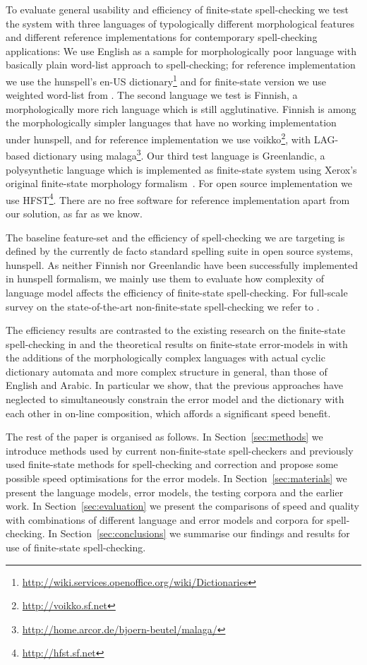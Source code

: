 \documentclass[11pt]{article}
\begin{document}
To evaluate general usability and efficiency of finite-state spell-checking we
test the system with three languages of typologically different morphological
features and different reference implementations for contemporary
spell-checking applications: We use English as a sample for morphologically
poor language with basically plain word-list approach to spell-checking; for
reference implementation we use the hunspell's en-US
dictionary\footnote{\url{http://wiki.services.openoffice.org/wiki/Dictionaries}}
and for finite-state version we use weighted word-list
from .  The second language we test is Finnish, a
morphologically more rich language which is still agglutinative. Finnish is
among the morphologically simpler languages that have no working implementation
under hunspell, and for reference implementation we use
voikko\footnote{\url{http://voikko.sf.net}}, with LAG-based dictionary using
malaga\footnote{\url{http://home.arcor.de/bjoern-beutel/malaga/}}. Our third
test language is Greenlandic, a polysynthetic language which is implemented as
finite-state system using Xerox's original finite-state morphology
formalism~\cite{beesley/2003}. For open source implementation we use
HFST\footnote{\url{http://hfst.sf.net}}. There are no free software for
reference implementation apart from our solution, as far as we know.

The baseline feature-set and the efficiency of spell-checking we are targeting
is defined by the currently de facto standard spelling suite in open source
systems, hunspell. As neither Finnish nor Greenlandic have been successfully
implemented in hunspell formalism, we mainly use them to evaluate how complexity
of language model affects the efficiency of finite-state spell-checking. For
full-scale survey on the state-of-the-art non-finite-state spell-checking we
refer to .

The efficiency results are contrasted to the existing research on the
finite-state spell-checking in  and the theoretical
results on finite-state error-models in  with the
additions of the morphologically complex languages with actual cyclic
dictionary automata and more complex structure in general, than those of
English and Arabic. In particular we show, that the previous approaches have
neglected to simultaneously constrain the error model and the dictionary with
each other in on-line composition, which affords a significant speed benefit.

The rest of the paper is organised as follows. In Section~\ref{sec:methods} we
introduce methods used by current non-finite-state spell-checkers and
previously used finite-state methods for spell-checking and correction and
propose some possible speed optimisations for the error models. In
Section~\ref{sec:materials} we present the language models, error models, the
testing corpora and the earlier work. In Section~\ref{sec:evaluation} we
present the comparisons of speed and quality with combinations of different
language and error models and corpora for spell-checking. In
Section~\ref{sec:conclusions} we summarise our findings and results for use
of finite-state spell-checking.
\end{document}
